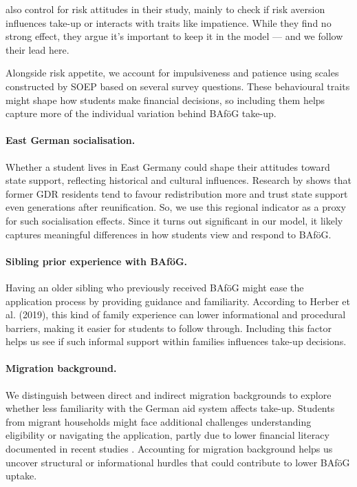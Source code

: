 \cite{herber_non-take-up_2019} also control for risk attitudes in their study, mainly to check if risk aversion influences take-up or interacts with traits like impatience.  
While they find no strong effect, they argue it’s important to keep it in the model — and we follow their lead here.  

Alongside risk appetite, we account for impulsiveness and patience using scales constructed by SOEP based on several survey questions.  
These behavioural traits might shape how students make financial decisions, so including them helps capture more of the individual variation behind BAföG take-up.

\paragraph{East German socialisation.}  
Whether a student lives in East Germany could shape their attitudes toward state support, reflecting historical and cultural influences.  
Research by \cite{alesina_good-bye_2007} shows that former GDR residents tend to favour redistribution more and trust state support even generations after reunification.  
So, we use this regional indicator as a proxy for such socialisation effects.  
Since it turns out significant in our model, it likely captures meaningful differences in how students view and respond to BAföG.

\paragraph{Sibling prior experience with BAföG.}  
Having an older sibling who previously received BAföG might ease the application process by providing guidance and familiarity.  
According to Herber et al. (2019), this kind of family experience can lower informational and procedural barriers, making it easier for students to follow through.  
Including this factor helps us see if such informal support within families influences take-up decisions.

\paragraph{Migration background.}  
We distinguish between direct and indirect migration backgrounds to explore whether less familiarity with the German aid system affects take-up.  
Students from migrant households might face additional challenges understanding eligibility or navigating the application, partly due to lower financial literacy documented in recent studies \citep{Tsegay_2024}.  
Accounting for migration background helps us uncover structural or informational hurdles that could contribute to lower BAföG uptake.

